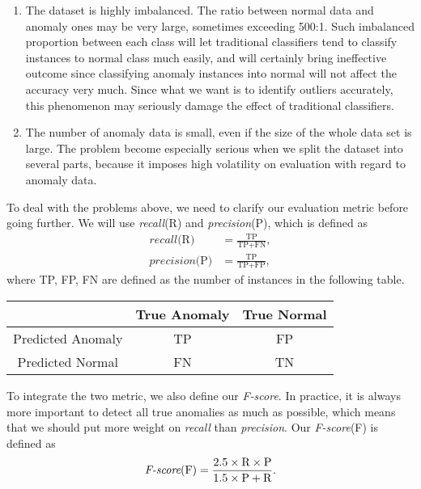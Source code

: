 \documentclass[english]{article}
\newenvironment{eqt}{\begin{equation}\begin{aligned}}{\end{aligned}\end{equation}}
\begin{document}
\begin{enumerate}
\item The dataset is highly imbalanced. The ratio between normal data and anomaly ones may be very large, sometimes exceeding 500:1. Such imbalanced proportion between each class will let traditional classifiers tend to classify instances to normal class much easily, and will certainly bring ineffective outcome since classifying anomaly instances into normal will not affect the accuracy very much. Since what we want is to identify outliers accurately, this phenomenon may seriously damage the effect of traditional classifiers.
\item The number of anomaly data is small, even if the size of the whole data set is large. The problem become especially serious when we split the dataset into several parts, because it imposes high volatility on evaluation with regard to anomaly data.
\end{enumerate} 
\par To deal with the problems above, we need to clarify our evaluation metric before going further. We will use \textit{recall}(R) and \textit{precision}(P), which is defined as
\begin{eqt}
\textit{recall}\text{(R)} & = \frac{\text{TP}}{\text{TP}+\text{FN}},\\ 
\textit{precision}\text{(P)} & = \frac{\text{TP}}{\text{TP}+\text{FP}},
\end{eqt}
where TP, FP, FN are defined as the number of instances in the following table.
\begin{table}[h]
	\centering
	\begin{tabular}{|c|c|c|}
		\hline
			& True Anomaly & True Normal\\
		\hline
			Predicted Anomaly & TP & FP\\
		\hline
			Predicted Normal & FN & TN\\
		\hline
	\end{tabular}
\end{table}
\par To integrate the two metric, we also define our \textit{F-score}. In practice, it is always more important to detect all true anomalies as much as possible, which means that we should put more weight on \textit{recall} than \textit{precision}. Our \textit{F-score}(F) is defined as
\begin{eqt}
\textit{F-score}\text{(F)} = \frac{2.5\times \text R\times \text P}{1.5\times \text P + \text R}.
\end{eqt}
\end{document}
